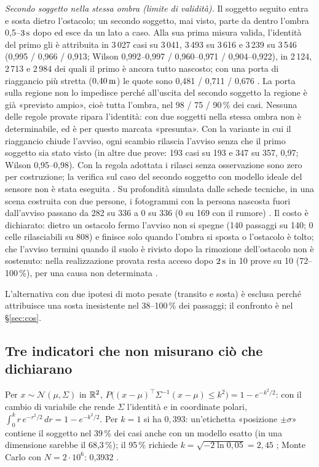 \emph{Secondo soggetto nella stessa ombra (limite di validità).} Il soggetto seguito entra e sosta dietro l'ostacolo; un secondo soggetto, mai visto, parte da dentro l'ombra 0,5--$3\,\mathrm{s}$ dopo ed esce da un lato a caso. Alla sua prima misura valida, l'identità del primo gli è attribuita in 3\,027 casi su 3\,041, 3\,493 su 3\,616 e 3\,239 su 3\,546 (0,995 / 0,966 / 0,913; Wilson 0,992--0,997 / 0,960--0,971 / 0,904--0,922), in 2\,124, 2\,713 e 2\,984 dei quali il primo è ancora tutto nascosto; con una porta di riaggancio più stretta ($0{,}40\,\mathrm{m}$) le quote sono 0,481 / 0,711 / 0,676 . La porta sulla regione non lo impedisce perché all'uscita del secondo soggetto la regione è già «previsto ampio», cioè tutta l'ombra, nel 98 / 75 / 90\,\% dei casi. Nessuna delle regole provate ripara l'identità: con due soggetti nella stessa ombra non è determinabile, ed è per questo marcata «presunta». Con la variante in cui il riaggancio chiude l'avviso, ogni scambio rilascia l'avviso senza che il primo soggetto sia stato visto (in altre due prove: 193 casi su 193 e 347 su 357, 0,97; Wilson 0,95--0,98). Con la regola adottata i rilasci senza osservazione sono zero per costruzione; la verifica sul caso del secondo soggetto con modello ideale del sensore non è stata eseguita . Su profondità simulata dalle schede tecniche, in una scena costruita con due persone, i fotogrammi con la persona nascosta fuori dall'avviso passano da 282 su 336 a 0 su 336 (0 su 169 con il rumore) . Il costo è dichiarato: dietro un ostacolo fermo l'avviso non si spegne (140 passaggi su 140; 0 celle rilasciabili su 808) e finisce solo quando l'ombra si sposta o l'ostacolo è tolto; che l'avviso termini quando il suolo è rivisto dopo la rimozione dell'ostacolo non è sostenuto: nella realizzazione provata resta acceso dopo $2\,\mathrm{s}$ in 10 prove su 10 (72--100\,\%), per una causa non determinata .

L'alternativa con due ipotesi di moto pesate (transito e sosta) è esclusa perché attribuisce una sosta inesistente nel 38--100\,\% dei passaggi; il confronto è nel \S\ref{sec:cos}.

\subsection{Tre indicatori che non misurano ciò che dichiarano}\label{sec:occ-indicatori}

\begin{osservazione}\label{oss:occ-sigma}
Per $x\sim\mathcal N(\mu,\Sigma)$ in $\mathbb{R}^2$, $P\bigl((x-\mu)^{\top}\Sigma^{-1}(x-\mu)\le k^2\bigr)=1-e^{-k^2/2}$: con il cambio di variabile che rende $\Sigma$ l'identità e in coordinate polari, $\int_0^k r\,e^{-r^2/2}\,dr=1-e^{-k^2/2}$. Per $k=1$ si ha $0{,}393$: un'etichetta «posizione $\pm\sigma$» contiene il soggetto nel 39\,\% dei casi anche con un modello esatto (in una dimensione sarebbe il 68,3\,\%); il 95\,\% richiede $k=\sqrt{-2\ln 0{,}05}=2{,}45$ ; Monte Carlo con $N=2\cdot10^6$: 0,3932 .
\end{osservazione}

